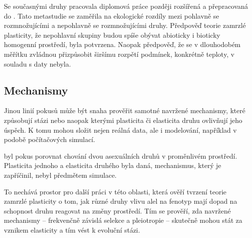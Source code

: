 Se současnými druhy  pracovala diplomová práce \citet{toman2013} později rozšířená a přepracovaná do \citet{toman2015}.
Tato metastudie se zaměřila na ekologické rozdíly mezi pohlavně se rozmnožujícími a nepohlavně se rozmnožujícími druhy.
Předpověď teorie zamrzlé plasticity, že nepohlavní skupiny budou spíše obývat abioticky i bioticky homogenní prostředí,
byla potvrzena. Naopak předpověď, že se v dlouhodobém měřítku zvládnou přizpůsobit širšímu rozpětí podmínek, konkrétně
teploty, v souladu s daty nebyla.

\subsection{Mechanismy}

Jinou linií pokusů může být snaha prověřit samotné navržené mechanismy, které způsobují stázi nebo naopak kterými
plasticita či elasticita druhu ovlivňují jeho úspěch. K tomu mohou složit nejen reálná data, ale i
modelování, například v podobě počítačových simulací.

\citet{Flegr139030} byl pokus porovnat chování dvou asexuálních druhů v proměnlivém prostředí. Plasticita jednoho a
elasticita druhého byla daná, mechanismus, který je zapříčinil, nebyl předmětem simulace.

To nechává prostor pro další práci v této oblasti, která ověří tvrzení teorie zamrzlé plasticity o tom, jak
různé druhy vlivu alel na fenotyp mají dopad na schopnost druhu reagovat na změny prostředí. Tím se prověří, zda
navržené mechanismy -- frekvenčně závislá selekce a pleiotropie -- skutečně mohou stát za vznikem elasticity a tím
vést k evoluční stázi.